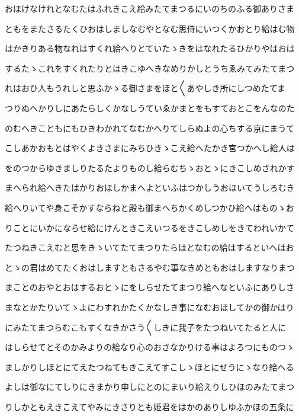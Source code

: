 \documentclass[a4paper,11pt,landscape]{ltjtarticle}
\begin{document}
おほけなけれとなむたはふれきこえ給みたてまつるにいのちのふる御ありさま
\par\medskip
ともをまたさるたくひおはしましなむやとなむ思侍にいつくかおとり給はむ物
\par\medskip
はかきりある物なれはすくれ給へりとていたゝきをはなれたるひかりやはおは
\par\medskip
するたゝこれをすくれたりとはきこゆへきなめりかしとうちゑみてみたてまつ
\par\medskip
れはおひ人もうれしと思ふかゝる御さまをほと〱あやしき所にしつめたてま
\par\medskip
つりぬへかりしにあたらしくかなしうていゑかまとをもすておとこをんなのた
\par\medskip
のむへきこともにもひきわかれてなむかへりてしらぬよの心ちする京にまうて
\par\medskip
こしあかおもとはやくよきさまにみちひきゝこえ給へたかき宮つかへし給人は
\par\medskip
をのつからゆきましりたるたよりものし給らむちゝおとゝにきこしめされかす
\par\medskip
まへられ給へきたはかりおほしかまへよといふはつかしうおほいてうしろむき
\par\medskip
給へりいてや身こそかすならねと殿も御まへちかくめしつかひ給へはものゝお
\par\medskip
りことにいかにならせ給にけんときこえいつるをきこしめしをきてわれいかて
\par\medskip
たつねきこえむと思をきゝいてたてまつりたらはとなむの給はするといへはお
\par\medskip
とゝの君はめてたくおはしますともさるやむ事なきめともおはしますなりまつ
\par\medskip
まことのおやとおはするおとゝにをしらせたてまつり給へなといふにありしさ
\par\medskip
まなとかたりいてゝよにわすれかたくかなしき事になむおほしてかの御かはり
\par\medskip
にみたてまつらむこもすくなきかさう〱しきに我子をたつねいてたると人に
\par\medskip
はしらせてとそのかみよりの給なり心のおさなかりける事はよろつにものつゝ
\par\medskip
ましかりしほとにてえたつねてもきこえてすこしゝほとにせうにゝなり給へる
\par\medskip
よしは御なにてしりにきまかり申しにとのにまいり給えりしひほのみたてまつ
\par\medskip
りしかともえきこえてやみにきさりとも姫君をはかのありしゆふかほの五条に
\par\medskip
\end{document}
